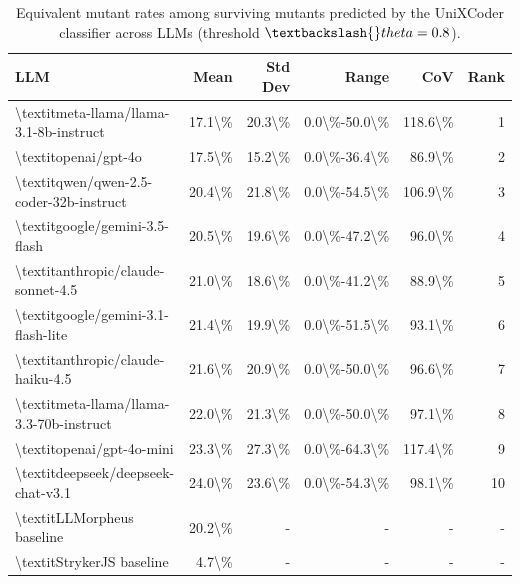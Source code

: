 \begin{table}[htbp]
\centering
{\small
\begin{tabular}{l|rrrrr}
\toprule
\textbf{LLM} & \textbf{Mean} & \textbf{Std Dev} & \textbf{Range} & \textbf{CoV} & \textbf{Rank} \\
\midrule
\textbackslash{}textit{meta-llama/llama-3.1-8b-instruct} & 17.1\textbackslash{}\% & 20.3\textbackslash{}\% & 0.0\textbackslash{}\%-50.0\textbackslash{}\% & 118.6\textbackslash{}\% & 1 \\
\textbackslash{}textit{openai/gpt-4o} & 17.5\textbackslash{}\% & 15.2\textbackslash{}\% & 0.0\textbackslash{}\%-36.4\textbackslash{}\% & 86.9\textbackslash{}\% & 2 \\
\textbackslash{}textit{qwen/qwen-2.5-coder-32b-instruct} & 20.4\textbackslash{}\% & 21.8\textbackslash{}\% & 0.0\textbackslash{}\%-54.5\textbackslash{}\% & 106.9\textbackslash{}\% & 3 \\
\textbackslash{}textit{google/gemini-3.5-flash} & 20.5\textbackslash{}\% & 19.6\textbackslash{}\% & 0.0\textbackslash{}\%-47.2\textbackslash{}\% & 96.0\textbackslash{}\% & 4 \\
\textbackslash{}textit{anthropic/claude-sonnet-4.5} & 21.0\textbackslash{}\% & 18.6\textbackslash{}\% & 0.0\textbackslash{}\%-41.2\textbackslash{}\% & 88.9\textbackslash{}\% & 5 \\
\textbackslash{}textit{google/gemini-3.1-flash-lite} & 21.4\textbackslash{}\% & 19.9\textbackslash{}\% & 0.0\textbackslash{}\%-51.5\textbackslash{}\% & 93.1\textbackslash{}\% & 6 \\
\textbackslash{}textit{anthropic/claude-haiku-4.5} & 21.6\textbackslash{}\% & 20.9\textbackslash{}\% & 0.0\textbackslash{}\%-50.0\textbackslash{}\% & 96.6\textbackslash{}\% & 7 \\
\textbackslash{}textit{meta-llama/llama-3.3-70b-instruct} & 22.0\textbackslash{}\% & 21.3\textbackslash{}\% & 0.0\textbackslash{}\%-50.0\textbackslash{}\% & 97.1\textbackslash{}\% & 8 \\
\textbackslash{}textit{openai/gpt-4o-mini} & 23.3\textbackslash{}\% & 27.3\textbackslash{}\% & 0.0\textbackslash{}\%-64.3\textbackslash{}\% & 117.4\textbackslash{}\% & 9 \\
\textbackslash{}textit{deepseek/deepseek-chat-v3.1} & 24.0\textbackslash{}\% & 23.6\textbackslash{}\% & 0.0\textbackslash{}\%-54.3\textbackslash{}\% & 98.1\textbackslash{}\% & 10 \\
\textbackslash{}textit{LLMorpheus baseline} & 20.2\textbackslash{}\% & - & - & - & - \\
\textbackslash{}textit{StrykerJS baseline} & 4.7\textbackslash{}\% & - & - & - & - \\
\bottomrule
\end{tabular}
}
\caption{Equivalent mutant rates among surviving mutants predicted by the UniXCoder classifier across LLMs (threshold $\textbackslash{}theta=0.8$).}
\label{tab:llm-equiv-main}
\end{table}